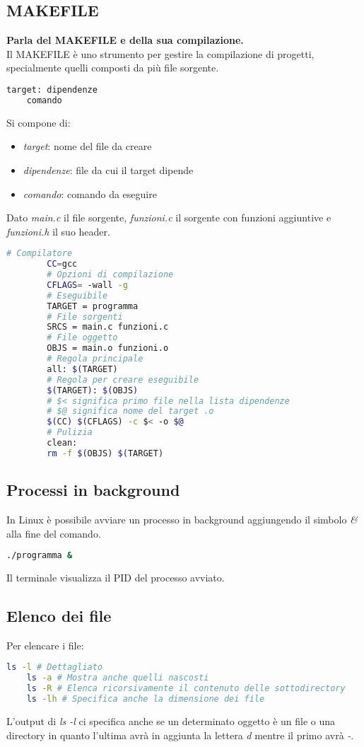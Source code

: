 \subsection{MAKEFILE}
\textbf{Parla del MAKEFILE e della sua compilazione.}\\
Il MAKEFILE è uno strumento per gestire la compilazione di progetti, specialmente quelli composti da più file sorgente.
\begin{lstlisting}[language=BASH]
	target: dipendenze
	comando
\end{lstlisting}
Si compone di:
\begin{itemize}
	\item \textit{target}: nome del file da creare
	\item \textit{dipendenze}: file da cui il target dipende
	\item \textit{comando}: comando da eseguire
\end{itemize}
\begin{example}[MAKEFILE]
	Dato \textit{main.c} il file sorgente, \textit{funzioni.c} il sorgente con funzioni aggiuntive e \textit{funzioni.h} il suo header.
	\begin{lstlisting}[language=BASH]
		# Compilatore
		CC=gcc
		# Opzioni di compilazione
		CFLAGS= -wall -g
		# Eseguibile
		TARGET = programma
		# File sorgenti
		SRCS = main.c funzioni.c
		# File oggetto
		OBJS = main.o funzioni.o
		# Regola principale
		all: $(TARGET)
		# Regola per creare eseguibile
		$(TARGET): $(OBJS)
		# $< significa primo file nella lista dipendenze
		# $@ significa nome del target .o
		$(CC) $(CFLAGS) -c $< -o $@
		# Pulizia
		clean:
		rm -f $(OBJS) $(TARGET)
	\end{lstlisting}
\end{example}

\subsection{Processi in background}
In Linux è possibile avviare un processo in background aggiungendo il simbolo \textit{\&} alla fine del comando.
\begin{lstlisting}[language=BASH]
	./programma &
\end{lstlisting}
Il terminale visualizza il PID del processo avviato.

\subsection{Elenco dei file}
Per elencare i file:
\begin{lstlisting}[language=BASH]
	ls -l # Dettagliato
	ls -a # Mostra anche quelli nascosti
	ls -R # Elenca ricorsivamente il contenuto delle sottodirectory
	ls -lh # Specifica anche la dimensione dei file
\end{lstlisting}
L'output di \textit{ls -l} ci specifica anche se un determinato oggetto è un file o una directory in quanto l'ultima avrà in aggiunta la lettera \textit{d} mentre il primo avrà \textit{-}.

